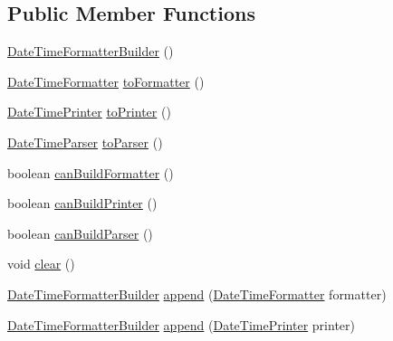 \subsection*{Public Member Functions}
\begin{DoxyCompactItemize}
\item 
\hyperlink{classorg_1_1joda_1_1time_1_1format_1_1_date_time_formatter_builder_aec2c332fc9bcee66ccf7bc357f8d0f76}{Date\-Time\-Formatter\-Builder} ()
\item 
\hyperlink{classorg_1_1joda_1_1time_1_1format_1_1_date_time_formatter}{Date\-Time\-Formatter} \hyperlink{classorg_1_1joda_1_1time_1_1format_1_1_date_time_formatter_builder_afacacf2fabd98cc9bdd841d4f603e825}{to\-Formatter} ()
\item 
\hyperlink{interfaceorg_1_1joda_1_1time_1_1format_1_1_date_time_printer}{Date\-Time\-Printer} \hyperlink{classorg_1_1joda_1_1time_1_1format_1_1_date_time_formatter_builder_a3cbbc396ac0dae8ce22300a31e48570d}{to\-Printer} ()
\item 
\hyperlink{interfaceorg_1_1joda_1_1time_1_1format_1_1_date_time_parser}{Date\-Time\-Parser} \hyperlink{classorg_1_1joda_1_1time_1_1format_1_1_date_time_formatter_builder_a7e0b858778b219841899ee2e0a56ebf8}{to\-Parser} ()
\item 
boolean \hyperlink{classorg_1_1joda_1_1time_1_1format_1_1_date_time_formatter_builder_ab6fdec034c31e914f0cb384c38d4e82d}{can\-Build\-Formatter} ()
\item 
boolean \hyperlink{classorg_1_1joda_1_1time_1_1format_1_1_date_time_formatter_builder_a8f1f921792333c73b90fed6c007cf698}{can\-Build\-Printer} ()
\item 
boolean \hyperlink{classorg_1_1joda_1_1time_1_1format_1_1_date_time_formatter_builder_a04c89b920aeda0eb5e3afdfaf412cd69}{can\-Build\-Parser} ()
\item 
void \hyperlink{classorg_1_1joda_1_1time_1_1format_1_1_date_time_formatter_builder_aed886a2694690aa0cdfeeaa7500f3343}{clear} ()
\item 
\hyperlink{classorg_1_1joda_1_1time_1_1format_1_1_date_time_formatter_builder}{Date\-Time\-Formatter\-Builder} \hyperlink{classorg_1_1joda_1_1time_1_1format_1_1_date_time_formatter_builder_aef6cf348838487ff9fdebaafa523aa69}{append} (\hyperlink{classorg_1_1joda_1_1time_1_1format_1_1_date_time_formatter}{Date\-Time\-Formatter} formatter)
\item 
\hyperlink{classorg_1_1joda_1_1time_1_1format_1_1_date_time_formatter_builder}{Date\-Time\-Formatter\-Builder} \hyperlink{classorg_1_1joda_1_1time_1_1format_1_1_date_time_formatter_builder_a1924c60036d8cf659c307957ad29a7cc}{append} (\hyperlink{interfaceorg_1_1joda_1_1time_1_1format_1_1_date_time_printer}{Date\-Time\-Printer} printer)

\end{DoxyCompactItemize}
